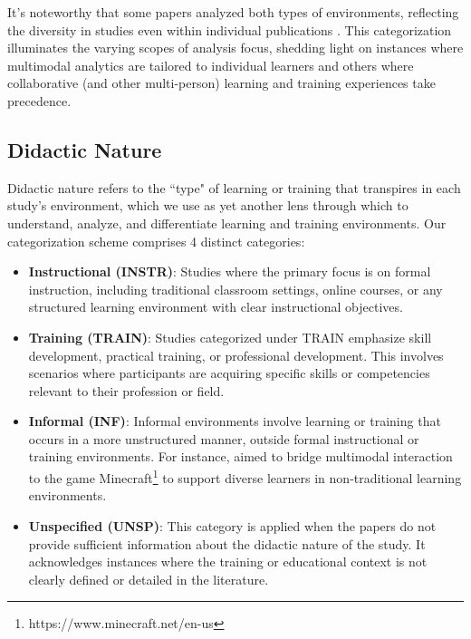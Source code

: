 \documentclass[manuscript,screen,review]{acmart}
\begin{document}
It's noteworthy that some papers analyzed both types of environments, reflecting the diversity in studies even within individual publications \cite{1326191931, 3637456466}. This categorization illuminates the varying scopes of analysis focus, shedding light on instances where multimodal analytics are tailored to individual learners and others where collaborative (and other multi-person) learning and training experiences take precedence.

\subsection{Didactic Nature} \label{subsec:didactic_nature}

Didactic nature refers to the ``type" of learning or training that transpires in each study's environment, which we use as yet another lens through which to understand, analyze, and differentiate learning and training environments. Our categorization scheme comprises 4 distinct categories:

\begin{itemize}
    \item \textbf{Instructional (INSTR)}: Studies where the primary focus is on formal instruction, including traditional classroom settings, online courses, or any structured learning environment with clear instructional objectives.

    \item \textbf{Training (TRAIN)}: Studies categorized under TRAIN emphasize skill development, practical training, or professional development. This involves scenarios where participants are acquiring specific skills or competencies relevant to their profession or field.
    
    \item \textbf{Informal (INF)}: Informal environments involve learning or training that occurs in a more unstructured manner, outside formal instructional or training environments. For instance, \citet{666050348} aimed to bridge multimodal interaction to the game Minecraft\footnote{https://www.minecraft.net/en-us} to support diverse learners in non-traditional learning environments. 
    
    \item \textbf{Unspecified (UNSP)}: This category is applied when the papers do not provide sufficient information about the didactic nature of the study. It acknowledges instances where the training or educational context is not clearly defined or detailed in the literature.
\end{itemize}
\end{document}
